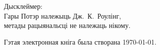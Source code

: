 \newpage
\vspace*{4cm}
\begin{center}
Дысклеймер:\\Гары Потэр належыць Дж.~К.~Роулінг,\\метады рацыянальсці не належаць нікому.
\end{center}

\vfill
Гэтая электронная кніга была створана \today{}.
